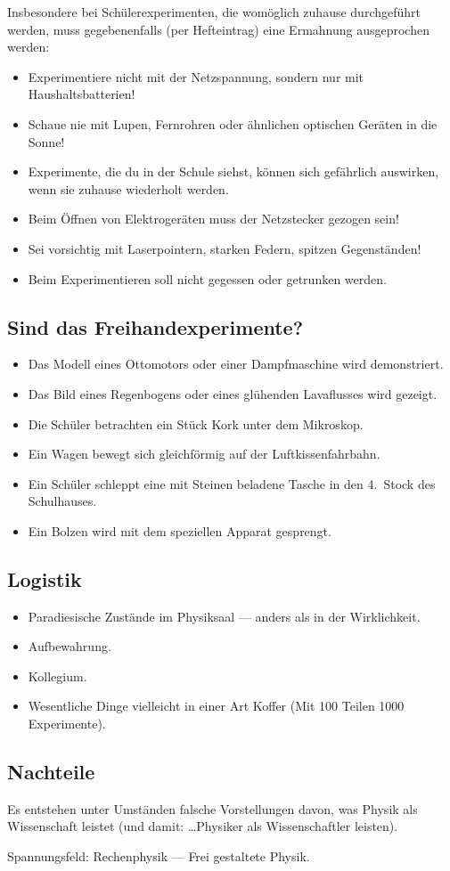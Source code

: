\begin{itemize}
	\mip
	Insbesondere bei Sch\"{u}lerexperimenten, die wom\"{o}glich zuhause
	durchgef\"{u}hrt werden, muss gegebenenfalls (per Hefteintrag)
	eine Ermahnung ausgeprochen werden:
	\begin{itemize}
		\item
		Experimentiere nicht mit der Netzspannung, sondern nur mit
		Haushaltsbatterien!
		\item
		Schaue nie mit Lupen, Fernrohren oder \"{a}hnlichen optischen
		Ger\"{a}ten in die Sonne!
		\item
		Experimente, die du in der Schule siehst, k\"{o}nnen sich
		gef\"{a}hrlich auswirken, wenn sie zuhause wiederholt werden.
		\item
		Beim \"{O}ffnen von Elektroger\"{a}ten muss der Netzstecker gezogen sein!
		\item
		Sei vorsichtig mit Laserpointern, starken Federn, spitzen
		Gegenst\"{a}nden!
		\item
		Beim Experimentieren soll nicht gegessen oder getrunken werden.
	\end{itemize}

\end{itemize}

\subsection{Sind das Freihandexperimente?}
\begin{itemize}
	\item
	Das Modell eines Ottomotors oder einer Dampfmaschine
	wird demonstriert.
	\item
	Das Bild eines Regenbogens oder eines gl\"{u}henden Lavaflusses
	wird gezeigt.
	\item
	Die Sch\"{u}ler betrachten ein St\"{u}ck Kork unter dem Mikroskop.
	\item
	Ein Wagen bewegt sich gleichf\"{o}rmig auf der Luftkissenfahrbahn.
	\item
	Ein Sch\"{u}ler schleppt eine mit Steinen beladene Tasche in den
	4.\ Stock des Schulhauses.
	\item
	Ein Bolzen wird mit dem speziellen Apparat gesprengt.
\end{itemize}

\subsection{Logistik}

\begin{itemize}
	\item Paradiesische Zust\"{a}nde im Physiksaal ---  anders als in der Wirklichkeit.
	\item Aufbewahrung.
	\item Kollegium.
	\item Wesentliche Dinge vielleicht in einer Art Koffer (Mit 100 Teilen 1000 Experimente).
\end{itemize}

\subsection{Nachteile}

Es entstehen unter Umst\"{a}nden falsche Vorstellungen davon,
was Physik als Wissenschaft leistet
(und damit: \dots Physiker als Wissenschaftler leisten).

Spannungsfeld: Rechenphysik --- Frei gestaltete Physik.
